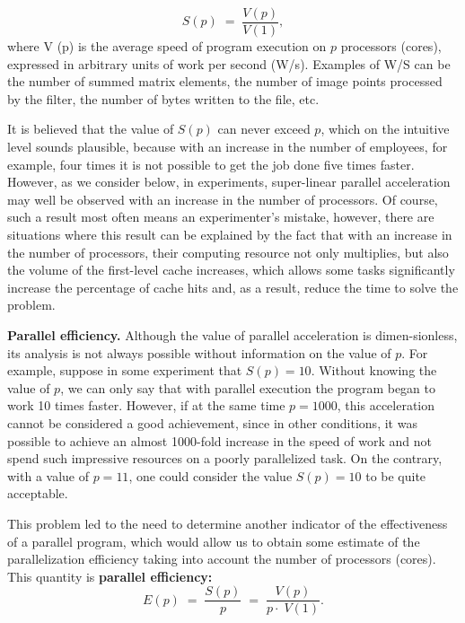 {	\begin{equation}
		\label{parallelAcceleration:equation}
		S(p)\;=\;\frac{V(p)}{V(1)},
	\end{equation}
	where V (p) is the average speed of program execution on $p$ processors (cores), expressed in arbitrary units of work per second (W/s). Examples of W/S can be the number of summed matrix elements, the number of image points processed by the filter, the number of bytes written to the file, etc.
	\par It is believed that the value of $ S(p)$ can never exceed $p$, which on the intuitive level sounds plausible, because with an increase in the number of employees, for example, four times it is not possible to get the job done five times faster. However, as we consider below, in experiments, super-linear parallel acceleration may well be observed with an increase in the number of processors. Of course, such a result most often means an experimenter's mistake, however, there are situations where this result can be explained by the fact that with an increase in the number of processors, their computing resource not only multiplies, but also the volume of the first-level cache increases, which allows some tasks significantly increase the percentage of cache hits and, as a result, reduce the time to solve the problem.
	\par\textbf{Parallel efficiency.} Although the value of parallel acceleration is dimen-sionless, its analysis is not always possible without information on the value of $p$. For example, suppose in some experiment that $S(p) = 10$. Without knowing the value of $p$, we can only say that with parallel execution the program began to work 10 times faster. However, if at the same time $ p = 1000 $, this acceleration cannot be considered a good achievement, since in other conditions, it was possible to achieve an almost 1000-fold increase in the speed of work and not spend such impressive resources on a poorly parallelized task. On the contrary, with a value of $ p = 11 $, one could consider the value $ S (p) = 10 $ to be quite acceptable.
	\par This problem led to the need to determine another indicator of the effectiveness of a parallel program, which would allow us to obtain some estimate of the parallelization efficiency taking into account the number of processors (cores). This quantity is
	 \textbf{parallel efficiency:}
	\begin{equation}
		\label{parallelEffect:equation}
		E(p)\;=\;\frac{S(p)}p\;=\;\frac{V(p)}{p\cdot\;V(1)}.

\end{equation}}
